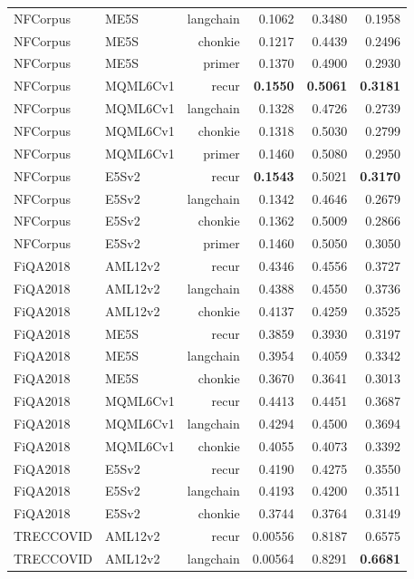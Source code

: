 \documentclass[conference]{IEEEtran}
\begin{document}
\begin{table}[!t]
\begin{tabular}{llrrrr}
NFCorpus & ME5S    & langchain & 0.1062 & 0.3480 & 0.1958 \\
NFCorpus & ME5S    & chonkie   & 0.1217 & 0.4439 & 0.2496 \\
NFCorpus & ME5S    & primer    & 0.1370 & 0.4900 & 0.2930 \\
NFCorpus & MQML6Cv1 & recur    & \textbf{0.1550} & \textbf{0.5061} & \textbf{0.3181} \\
NFCorpus & MQML6Cv1 & langchain & 0.1328 & 0.4726 & 0.2739 \\
NFCorpus & MQML6Cv1 & chonkie  & 0.1318 & 0.5030 & 0.2799 \\
NFCorpus & MQML6Cv1 & primer   & 0.1460 & 0.5080 & 0.2950 \\
NFCorpus & E5Sv2   & recur     & \textbf{0.1543} & 0.5021 & \textbf{0.3170} \\
NFCorpus & E5Sv2   & langchain & 0.1342 & 0.4646 & 0.2679 \\
NFCorpus & E5Sv2   & chonkie   & 0.1362 & 0.5009 & 0.2866 \\
NFCorpus & E5Sv2   & primer    & 0.1460 & 0.5050 & 0.3050 \\
\midrule
FiQA2018 & AML12v2 & recur     & 0.4346 & 0.4556 & 0.3727 \\
FiQA2018 & AML12v2 & langchain & 0.4388 & 0.4550 & 0.3736 \\
FiQA2018 & AML12v2 & chonkie   & 0.4137 & 0.4259 & 0.3525 \\
FiQA2018 & ME5S    & recur     & 0.3859 & 0.3930 & 0.3197 \\
FiQA2018 & ME5S    & langchain & 0.3954 & 0.4059 & 0.3342 \\
FiQA2018 & ME5S    & chonkie   & 0.3670 & 0.3641 & 0.3013 \\
FiQA2018 & MQML6Cv1 & recur    & 0.4413 & 0.4451 & 0.3687 \\
FiQA2018 & MQML6Cv1 & langchain & 0.4294 & 0.4500 & 0.3694 \\
FiQA2018 & MQML6Cv1 & chonkie  & 0.4055 & 0.4073 & 0.3392 \\
FiQA2018 & E5Sv2   & recur     & 0.4190 & 0.4275 & 0.3550 \\
FiQA2018 & E5Sv2   & langchain & 0.4193 & 0.4200 & 0.3511 \\
FiQA2018 & E5Sv2   & chonkie   & 0.3744 & 0.3764 & 0.3149 \\
\midrule
TRECCOVID & AML12v2 & recur     & 0.00556 & 0.8187 & 0.6575 \\
TRECCOVID & AML12v2 & langchain & 0.00564 & 0.8291 & \textbf{0.6681} \\

\end{tabular}
\end{table}
\end{document}
